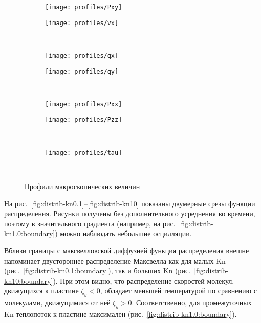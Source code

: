 \documentclass[a4paper,12pt]{article}
\newcommand{\Kn}{\mathrm{Kn}}
\begin{document}
\begin{figure}
    \vspace{-24pt}
    \centering
    \begin{subfigure}[b]{.5\linewidth}
        \centering
        \texttt{[image: profiles/Pxy]}
    	\label{fig:profile:Pxy}
    \end{subfigure}%
    \begin{subfigure}[b]{.5\linewidth}
        \centering
        \texttt{[image: profiles/vx]}
    	\label{fig:profile:vx}
    \end{subfigure}\\[-24pt]
    \begin{subfigure}[b]{.5\linewidth}
        \centering
        \texttt{[image: profiles/qx]}
    	\label{fig:profile:qx}
    \end{subfigure}%
    \begin{subfigure}[b]{.5\linewidth}
        \centering
        \texttt{[image: profiles/qy]}
    	\label{fig:profile:qy}
    \end{subfigure}\\[-24pt]
    \begin{subfigure}[b]{.5\linewidth}
        \centering
        \texttt{[image: profiles/Pxx]}
    	\label{fig:profile:Pxx}
    \end{subfigure}%
    \begin{subfigure}[b]{.5\linewidth}
        \centering
        \texttt{[image: profiles/Pzz]}
    	\label{fig:profile:Pzz}
    \end{subfigure}\\[-24pt]
    \begin{subfigure}[b]{\linewidth}
        \centering
        \texttt{[image: profiles/tau]}
    	\label{fig:profile:tau}
    \end{subfigure}\\[-6pt]
    \caption{Профили макроскопических величин}
    \label{fig:profiles}
\end{figure}

На рис.~\ref{fig:distrib-kn0.1}--\ref{fig:distrib-kn10} показаны двумерные срезы функции распределения.
Рисунки получены без дополнительного усреднения во времени, поэтому в значительного градиента
(например, на рис.~\ref{fig:distrib-kn1.0:boundary}) можно наблюдать небольшие осцилляции.

Вблизи границы с максвелловской диффузией функция распределения внешне напоминает
двустороннее распределение Максвелла как для малых \(\Kn\) (рис.~\ref{fig:distrib-kn0.1:boundary}),
так и больших \(\Kn\) (рис.~\ref{fig:distrib-kn10:boundary}).
При этом видно, что распределение скоростей молекул, движущихся к пластине \(\zeta_y<0\),
обладает меньшей температурой по сравнению с молекулами, движущимися от неё \(\zeta_y>0\).
Соответственно, для промежуточных \(\Kn\) теплопоток к пластине максимален (рис.~\ref{fig:distrib-kn1.0:boundary}).
\end{document}
